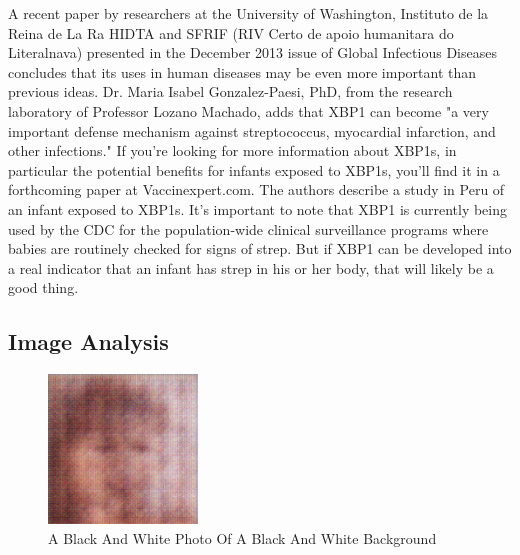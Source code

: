 \documentclass{article}%
\begin{document}
A recent paper by researchers at the University of Washington, Instituto de la Reina de La Ra HIDTA and SFRIF (RIV Certo de apoio humanitara do Literalnava) presented in the December 2013 issue of Global Infectious Diseases concludes that its uses in human diseases may be even more important than previous ideas. Dr. Maria Isabel Gonzalez{-}Paesi, PhD, from the research laboratory of Professor Lozano Machado, adds that XBP1 can become "a very important defense mechanism against streptococcus, myocardial infarction, and other infections."\newline%
If you're looking for more information about XBP1s, in particular the potential benefits for infants exposed to XBP1s, you'll find it in a forthcoming paper at Vaccinexpert.com. The authors describe a study in Peru of an infant exposed to XBP1s. It's important to note that XBP1 is currently being used by the CDC for the population{-}wide clinical surveillance programs where babies are routinely checked for signs of strep. But if XBP1 can be developed into a real indicator that an infant has strep in his or her body, that will likely be a good thing.

%
\subsection{Image Analysis}%
\label{subsec:ImageAnalysis}%


\begin{figure}[h!]%
\centering%
\includegraphics[width=150px]{500_fake_images/samples_5_133.png}%
\caption{A Black And White Photo Of A Black And White Background}%
\end{figure}

%
\end{document}
